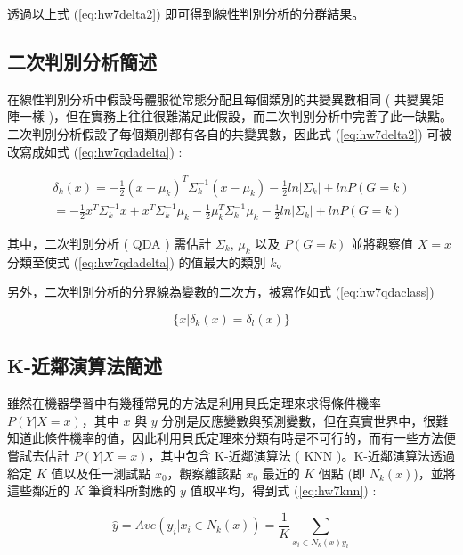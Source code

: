 透過以上式 (\ref{eq:hw7delta2}) 即可得到線性判別分析的分群結果。

\subsection{二次判別分析簡述}

在線性判別分析中假設母體服從常態分配且每個類別的共變異數相同 ( 共變異矩陣一樣 )，但在實務上往往很難滿足此假設，而二次判別分析中完善了此一缺點。二次判別分析假設了每個類別都有各自的共變異數，因此式 (\ref{eq:hw7delta2}) 可被改寫成如式 (\ref{eq:hw7qdadelta}) :

\begin{equation}\label{eq:hw7qdadelta}
\begin{split}
\delta_k(x)=-\frac{1}{2}(x-\mu_k)^{T}\Sigma_k^{-1}(x-\mu_k)-\frac{1}{2}ln \left| \Sigma_k \right|+ln P(G=k)\\
=-\frac{1}{2}x^{T}\Sigma_k^{-1}x+x^{T}\Sigma_k^{-1}\mu_k-\frac{1}{2}\mu_k^{T}\Sigma_k^{-1}\mu_k-\frac{1}{2}ln\left| \Sigma_k \right|+ln P(G=k)
\end{split}
\end{equation}

其中，二次判別分析 ( QDA ) 需估計 $\Sigma_k$, $\mu_k$ 以及 $P(G=k)$ 並將觀察值 $X=x$ 分類至使式 (\ref{eq:hw7qdadelta}) 的值最大的類別 $k$。

另外，二次判別分析的分界線為變數的二次方，被寫作如式 (\ref{eq:hw7qdaclass})

\begin{equation}\label{eq:hw7qdaclass}
\{  x|\delta_k(x)=\delta_l(x) \}
\end{equation}


\subsection{K-近鄰演算法簡述}

雖然在機器學習中有幾種常見的方法是利用貝氏定理來求得條件機率 $P(Y|X=x)$，其中 $x$ 與 $y$ 分別是反應變數與預測變數，但在真實世界中，很難知道此條件機率的值，因此利用貝氏定理來分類有時是不可行的，而有一些方法便嘗試去估計 $P(Y|X=x)$，其中包含 K-近鄰演算法 ( KNN )。K-近鄰演算法透過給定 $K$ 值以及任一測試點 $x_0$，觀察離該點 $x_0$ 最近的 $K$ 個點 (即 $N_k(x)$)，並將這些鄰近的 $K$ 筆資料所對應的 $y$ 值取平均，得到式 (\ref{eq:hw7knn}) :

\begin{equation}\label{eq:hw7knn}
\hat{y}=Ave(y_i|x_i \in N_k(x))=\frac{1}{K}\sum_{x_i \in N_k(x)y_i}
\end{equation}

